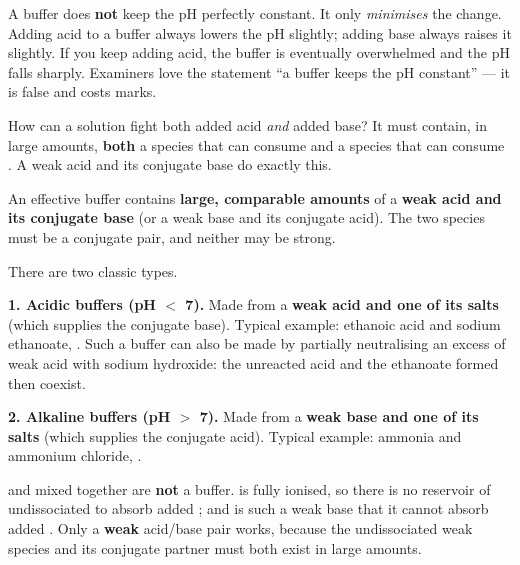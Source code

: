 \documentclass[11pt]{article}
\newcounter{popsec}
\newcounter{popsub}
\newcommand{\courssub}[1]{%
  \stepcounter{popsub}%
  \par\vspace{9pt}\noindent{\popxbold\fontsize{11.5}{13}\selectfont\color{popink}{\color{poporange}\thepopsec.\thepopsub}\hspace{6pt}#1}\par\nopagebreak\vspace{4pt}
}
\begin{document}
\begin{attention}
A buffer does \textbf{not} keep the pH perfectly constant. It only \emph{minimises} the change. Adding acid to a buffer always lowers the pH slightly; adding base always raises it slightly. If you keep adding acid, the buffer is eventually overwhelmed and the pH falls sharply. Examiners love the statement ``a buffer keeps the pH constant'' — it is false and costs marks.
\end{attention}

\courssub{Composition and Types of Buffers}

How can a solution fight both added acid \emph{and} added base? It must contain, in large amounts, \textbf{both} a species that can consume  and a species that can consume . A weak acid  and its conjugate base  do exactly this.

\begin{propriete}
An effective buffer contains \textbf{large, comparable amounts} of a \textbf{weak acid and its conjugate base} (or a weak base and its conjugate acid). The two species must be a conjugate pair, and neither may be strong.
\end{propriete}

There are two classic types.

\textbf{1. Acidic buffers (pH $<$ 7).} Made from a \textbf{weak acid and one of its salts} (which supplies the conjugate base). Typical example: ethanoic acid and sodium ethanoate, . Such a buffer can also be made by partially neutralising an excess of weak acid with sodium hydroxide: the unreacted acid and the ethanoate formed then coexist.

\textbf{2. Alkaline buffers (pH $>$ 7).} Made from a \textbf{weak base and one of its salts} (which supplies the conjugate acid). Typical example: ammonia and ammonium chloride, .

\begin{attention}
 and  mixed together are \textbf{not} a buffer.  is fully ionised, so there is no reservoir of undissociated  to absorb added ; and  is such a weak base that it cannot absorb added . Only a \textbf{weak} acid/base pair works, because the undissociated weak species and its conjugate partner must both exist in large amounts.
\end{attention}
\end{document}
